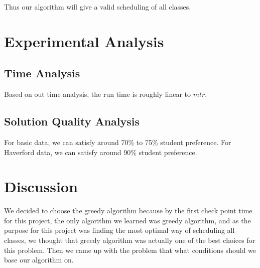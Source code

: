 \documentclass[11pt, oneside]{article}   	%
\begin{document}
Thus our algorithm will give a valid scheduling of all classes.


\newpage
\section{Experimental Analysis}
\subsection{Time Analysis}
Based on out time analysis, the run time is roughly linear to $mtr$.

\subsection{Solution Quality Analysis}
For basic data, we can satisfy around 70\% to 75\% student preference. For Haverford data, we can satisfy around 90\% student preference. %




\section{Discussion}
We decided to choose the greedy algorithm because by the first check point time for this project, the only algorithm we learned was greedy algorithm, and as the purpose for this project was finding the most optimal way of scheduling all classes, we thought that greedy algorithm was actually one of the best choices for this problem. Then we came up with the problem that what conditions should we base our algorithm on.
\end{document}
